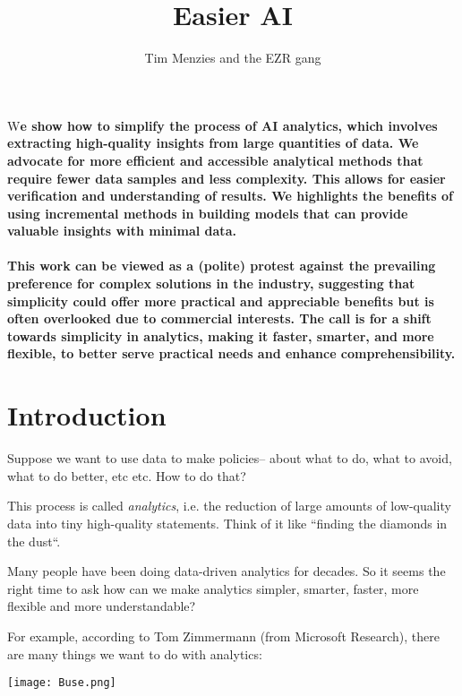 \documentclass[landscape,	DIV=calc,%
							paper=letter,%
							fontsize=10pt,%
							twocolumn]{scrartcl}	 					%
\title{Easier AI }					%
\author{Tim Menzies and the EZR gang }											%
\date{}
\newcommand{\initial}[1]{%
     \lettrine[lines=3,lhang=0.3,nindent=0em]{
     				\color{DarkGoldenrod}
     				{\textsf{#1}}}{}}
\begin{document}
\maketitle
\thispagestyle{fancy} 			%
\initial{W}\textbf{e show
how to simplify the process of AI analytics, which
involves extracting high-quality  insights from large quantities
of data. We advocate for more efficient and  accessible analytical
methods that require fewer data samples and less  complexity. This
allows for easier verification and understanding of results. We
highlights the benefits of using incremental methods  in building
models that can provide valuable insights with minimal data.~\\~\\ 
This  work can be viewed as a (polite) protest
against  the prevailing preference for complex solutions
in the industry,  suggesting that simplicity could offer more
practical and appreciable benefits but is often overlooked due to
commercial interests. The call is for a shift towards simplicity
in analytics, making it faster, smarter, and more flexible, to
better serve practical needs and enhance comprehensibility.}


\section*{Introduction}

Suppose we want to use data to make policies-- about what to do,
what to avoid, what to do better, etc etc. How to do that?

This process is called {\em analytics}, i.e. the reduction of large
amounts of low-quality data into tiny high-quality statements. Think of it like
``finding the diamonds in the dust``.

Many people have been doing data-driven analytics for decades.  So
it seems the right time  to ask how can we make  analytics  simpler,
smarter, faster, more flexible and more understandable?

For example,  according to Tom Zimmermann (from Microsoft Research),
there are many things we want to do with analytics:

\texttt{[image: Buse.png]} 
\end{document}
